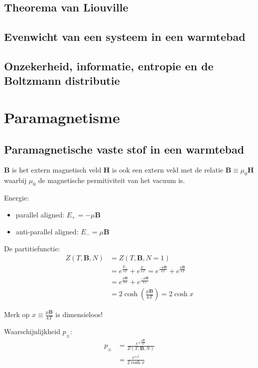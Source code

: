 \documentclass[a4paper,twoside]{article}
\theoremstyle{definition}
\theoremstyle{plain}
\begin{document}
\subsection{Theorema van Liouville}
\subsection{Evenwicht van een systeem in een warmtebad}
\subsection{Onzekerheid, informatie, entropie en de Boltzmann distributie}

\section{Paramagnetisme}
\subsection{Paramagnetische vaste stof in een warmtebad}
\(\bm{B}\) is het extern magnetisch veld \(\bm{H}\) is ook een extern veld met de relatie \(\bm{B} \equiv \mu_0 \bm{H}\) waarbij \(\mu_0\) de magnetische permitiviteit van het vacuum is.

Energie:
\begin{itemize}
    \item parallel aligned: \(E_+ = - \mu \bm B\)
    \item anti-parallel aligned: \(E_- = \mu \bm B\)
\end{itemize}


De partitiefunctie:
\begin{align*}
    Z(T,\bm B, N)
    &= Z(T,\bm B, N=1)\\
    &= e^{\frac{E_+}{kT}}+e^{\frac{E_-}{kT}}
    = e^{\frac{- \mu \bm B}{kT}}+e^{\frac{\mu \bm B}{kT}}\\
    &= e^{\frac{\mu \bm B}{kT}}+e^{\frac{-\mu \bm B}{kT}}\\
    &= 2 \cosh(\frac{\mu \bm B}{kT}) =  2 \cosh x
\end{align*}

Merk op \(x \equiv \frac{\mu \bm B}{kT}\) is dimensieloos!

Waarschijnlijkheid \(p_\pm\):
\begin{align*}
        p_\pm
        &= \frac{e^{\pm \frac{\mu \bm B}{kT}}}{Z(T,\bm B, N)}\\
        &= \frac{e^{\pm x}}{2 \cosh x}
\end{align*}
\end{document}
